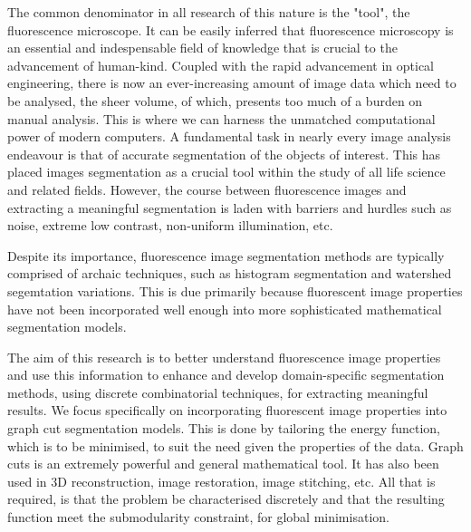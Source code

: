 The common denominator in all research of this nature is the "tool", the fluorescence microscope. 
It can be easily inferred that fluorescence microscopy is an essential and indespensable field of knowledge that is crucial to the advancement of human-kind. 
Coupled with the rapid advancement in optical engineering, there is now an ever-increasing amount of image data which need to be analysed, the sheer volume, of which, presents too much of a burden on manual analysis. 
This is where we can harness the unmatched computational power of modern computers. 
A fundamental task in nearly every image analysis endeavour is that of accurate segmentation of the objects of interest. 
This has placed images segmentation as a crucial tool within the study of all life science and related fields. 
However, the course between fluorescence images and extracting a meaningful segmentation is laden with barriers and hurdles such as noise, extreme low contrast, non-uniform illumination, etc.

Despite its importance, fluorescence image segmentation methods are typically comprised of archaic techniques, such as histogram segmentation and watershed segemtation variations. 
This is due primarily because fluorescent image properties have not been incorporated well enough into more sophisticated mathematical segmentation models. 

The aim of this research is to better understand fluorescence image properties and use this information
to enhance and develop domain-specific segmentation methods, using discrete combinatorial techniques, for extracting meaningful results. 
We focus specifically on incorporating fluorescent image properties into graph cut segmentation models. 
This is done by tailoring the energy function, which is to be minimised, to suit the need given the properties of the data.
Graph cuts is an extremely powerful and general mathematical tool. 
It has also been used in 3D reconstruction, image restoration, image stitching, etc. 
All that is required, is that the problem be characterised discretely and that the resulting function meet the submodularity constraint, for global minimisation.



